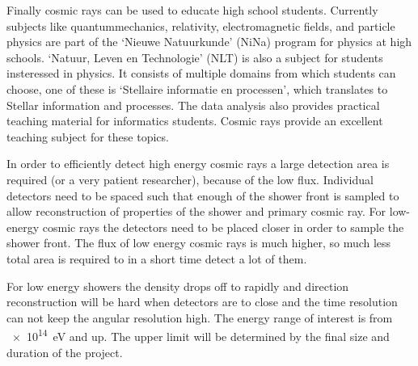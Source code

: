 Finally cosmic rays can be used to educate high school students. Currently subjects like quantummechanics, relativity, electromagnetic fields, and particle physics are part of the `Nieuwe Natuurkunde' (NiNa) program for physics at high schools. `Natuur, Leven en Technologie' (NLT) is also a subject for students insteressed in physics. It consists of multiple domains from which students can choose, one of these is `Stellaire informatie en processen', which translates to Stellar information and processes. The data analysis also provides practical teaching material for informatics students. Cosmic rays provide an excellent teaching subject for these topics.

In order to efficiently detect high energy cosmic rays a large detection area is required (or a very patient researcher), because of the low flux. Individual detectors need to be spaced such that enough of the shower front is sampled to allow reconstruction of properties of the shower and primary cosmic ray. For low-energy cosmic rays the detectors need to be placed closer in order to sample the shower front. The flux of low energy cosmic rays is much higher, so much less total area is required to in a short time detect a lot of them.

For low energy showers the density drops off to rapidly and direction reconstruction will be hard when detectors are to close and the time resolution can not keep the angular resolution high. The energy range of interest is from \SI{e14}{\eV} and up. The upper limit will be determined by the final size and duration of the project.

